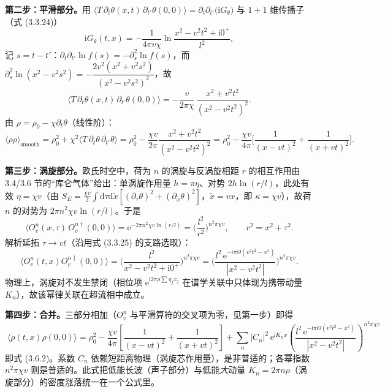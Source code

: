 \textbf{第二步：平滑部分。}用 $\langle T\,\partial_t\theta(x,t)\,\partial_{t'}\theta(0,0)\rangle
=\partial_t\partial_{t'}\big(\mathrm{i}G_\theta\big)$ 与 $1+1$ 维传播子（式 (3.3.24)）
\begin{equation*}
\mathrm{i}G_\theta(t,x)=-\frac{1}{4\pi v\chi}\ln\frac{x^{2}-v^{2}t^{2}+\mathrm{i}0^{+}}{l^{2}},
\end{equation*}
记 $s=t-t'$：$\partial_t\partial_{t'}\ln f(s)=-\partial_s^{2}\ln f(s)$，而
$\partial_s^{2}\ln(x^{2}-v^{2}s^{2})=-\dfrac{2v^{2}(x^{2}+v^{2}s^{2})}{(x^{2}-v^{2}s^{2})^{2}}$，故
\begin{equation*}
\langle T\,\partial_t\theta(x,t)\,\partial_{t'}\theta(0,0)\rangle
=-\frac{v}{2\pi\chi}\,\frac{x^{2}+v^{2}t^{2}}{(x^{2}-v^{2}t^{2})^{2}} .
\end{equation*}
由 $\rho=\rho_0-\chi\partial_t\theta$（线性阶）：
\begin{equation*}
\langle\rho\rho\rangle_{\text{smooth}}
=\rho_0^{2}+\chi^{2}\langle T\,\partial_t\theta\,\partial_{t'}\theta\rangle
=\rho_0^{2}-\frac{\chi v}{2\pi}\frac{x^{2}+v^{2}t^{2}}{(x^{2}-v^{2}t^{2})^{2}}
=\rho_0^{2}-\frac{\chi v}{4\pi}\Big[\frac{1}{(x-vt)^{2}}+\frac{1}{(x+vt)^{2}}\Big] .
\end{equation*}

\textbf{第三步：涡旋部分。}欧氏时空中，荷为 $n$ 的涡旋与反涡旋相距 $r$ 的相互作用由 3.4/3.6 节的“库仑气体”给出：单涡旋作用量 $h=\pi\eta$、对势 $2h\ln(r/l)$，此处有效 $\eta=\chi v$（由 $S_E=\frac{\chi v}{2}\int\mathrm{d}\tau\mathrm{d}\tilde x[(\partial_\tau\theta)^{2}+(\partial_{\tilde x}\theta)^{2}]$，$\tilde x=vx$，即 $\kappa=\chi v$），故荷 $n$ 的对势为 $2\pi n^{2}\chi v\ln(r/l)$。于是
\begin{equation*}
\langle O_v^{n}(x,\tau)\,O_v^{n\dagger}(0,0)\rangle
=\mathrm{e}^{-2\pi n^{2}\chi v\ln(r/l)}
=\Big(\frac{l^{2}}{r^{2}}\Big)^{n^{2}\pi\chi v},
\qquad r^{2}=x^{2}+\tau^{2} .
\end{equation*}
解析延拓 $\tau\to vt$（沿用式 (3.3.25) 的支路选取）：
\begin{equation*}
\langle O_v^{n}(t,x)O_v^{n\dagger}(0,0)\rangle
=\Big(\frac{l^{2}}{x^{2}-v^{2}t^{2}+\mathrm{i}0^{+}}\Big)^{n^{2}\pi\chi v}
=\Big(\frac{l^{2}\,\mathrm{e}^{-\mathrm{i}\pi\Theta(v^{2}t^{2}-x^{2})}}{|x^{2}-v^{2}t^{2}|}\Big)^{n^{2}\pi\chi v} .
\end{equation*}
物理上，涡旋对不发生禁闭（相位项 $\mathrm{e}^{\mathrm{i}2\pi\rho\sum q_jx_j}$ 在谱学关联中只体现为携带动量 $K_n$），故该幂律关联在超流相中成立。

\textbf{第四步：合并。}三部分相加（$O_v^n$ 与平滑算符的交叉项为零，见第一步）即得
\begin{equation*}
\boxed{\;
\langle\rho(t,x)\rho(0,0)\rangle
=\rho_0^{2}-\frac{\chi v}{4\pi}\left[\frac{1}{(x-vt)^{2}}+\frac{1}{(x+vt)^{2}}\right]
+\sum_n|C_n|^{2}\,\mathrm{e}^{\mathrm{i}K_nx}
\left(\frac{l^{2}\,\mathrm{e}^{-\mathrm{i}\pi\Theta(v^{2}t^{2}-x^{2})}}{|x^{2}-v^{2}t^{2}|}\right)^{n^{2}\pi\chi v}
\;}
\end{equation*}
即式 (3.6.2)。系数 $C_n$ 依赖短距离物理（涡旋芯作用量），是非普适的；各幂指数 $n^{2}\pi\chi v$ 则是普适的。此式把低能长波（声子部分）与低能\emph{大}动量 $K_n=2\pi n\rho$（涡旋部分）的密度涨落统一在一个公式里。

